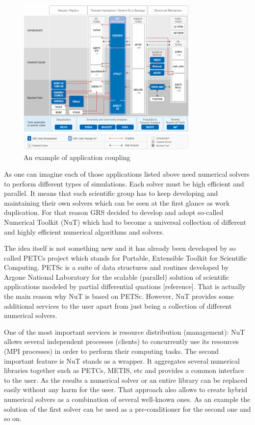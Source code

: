 \begin{figure}[htpb]
  \centering
  \includegraphics[width=0.8\textwidth]{figures/grs-application-coupling.png}
  \caption{An example of application coupling} \label{fig:applications}
\end{figure}

As one can imagine each of those applications listed above need numerical solvers to perform different types of simulations. Each solver must be high efficient and parallel. It means that each scientific group has to keep developing and maintaining their own solvers which can be seen at the first glance as work duplication. For that reason GRS decided to develop and adopt so-called Numerical Toolkit (NuT) which had to become a universal collection of different and highly efficient numerical algorithms and solvers.\par

The idea itself is not something new and it has already been developed by so called PETCs project which stands for Portable, Extensible Toolkit for Scientific Computing. PETSc is a suite of data structures and routines developed by Argone National Laboratory for the scalable (parallel) solution of scientific applications modeled by partial differential quations [reference]. That is actually the main reason why NuT is based on PETSc. However, NuT provides some additional services to the user apart from just being a collection of different numerical solvers.\par

One of the most important services is resource distribution (management): NuT allows several independent processes (clients) to concurrently use its resources (MPI processes) in order to perform their computing tasks. The second important feature is NuT stands as a wrapper. It aggregates several numerical libraries together such as PETCs, METIS, etc and provides a common interface to the user. As the results a numerical solver or an entire library can be replaced easily without any harm for the user. That approach also allows to create hybrid numerical solvers as a combination of several well-known ones. As an example the solution of the first solver can be used as a pre-conditioner for the second one and so on. 

